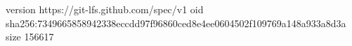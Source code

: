 version https://git-lfs.github.com/spec/v1
oid sha256:7349665858942338eccdd97f96860ced8e4ee0604502f109769a148a933a8d3a
size 156617
